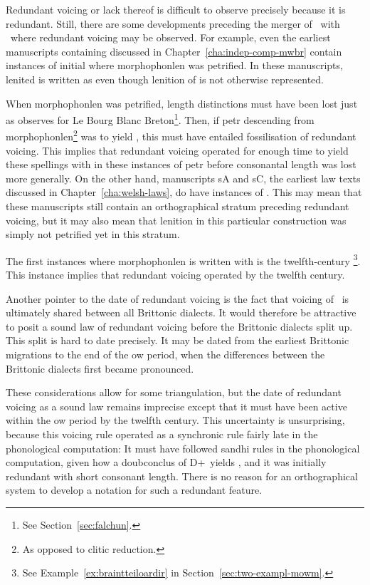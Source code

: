 Redundant voicing or lack thereof is difficult to observe precisely because it is redundant. Still, there are some developments preceding the merger of \lT\ with \xD\ where redundant voicing may be observed. For example, even the earliest manuscripts containing  discussed in Chapter~\ref{cha:indep-comp-mwbr} contain instances of initial  where \gls{morphophonlen} was petrified. In these manuscripts, lenited  is written as  even though lenition of  is not otherwise represented.

When \gls{morphophonlen} was petrified, length distinctions must have been lost just as \textcite{falchun_systeme_1951} observes for Le Bourg Blanc Breton\footnote{See Section~\ref{sec:falchun}.}. Then, if \gls{petr} descending from \gls{morphophonlen}\footnote{As opposed to clitic reduction.} was to yield , this must have entailed fossilisation of redundant voicing. This implies that redundant voicing operated for enough time to yield these spellings with  in these instances of \gls{petr} before consonantal length was lost more generally. On the other hand, manuscripts \gls{sA} and \gls{sC}, the earliest law texts discussed in Chapter~\ref{cha:welsh-laws}, do have instances of . This may mean that these manuscripts still contain an orthographical stratum preceding redundant voicing, but it may also mean that lenition in this particular construction was simply not petrified yet in this stratum.

The first instances where \gls{morphophonlen} is written with  is the twelfth-century \footnote{See Example~\ref{ex:braintteiloardir} in Section~\ref{sec:two-exampl-mowm}.}. This instance implies that redundant voicing operated by the twelfth century.

Another pointer to the date of redundant voicing is the fact that voicing of \lT\ is ultimately shared between all Brittonic dialects. It would therefore be attractive to posit a sound law of redundant voicing before the Brittonic dialects split up. This split is hard to date precisely. It may be dated from the earliest Brittonic migrations to the end of the \gls{ow} period, when the differences between the Brittonic dialects first became pronounced.

These considerations allow for some triangulation, but the date of redundant voicing as a sound law remains imprecise except that it must have been active within the \gls{ow} period  by the twelfth century. This uncertainty is  unsurprising, because this voicing rule operated as a synchronic rule fairly late in the phonological computation: It must have followed sandhi rules in the phonological computation, given how a \gls{doubconclus} of \gls{D}+\lT\ yields \xT, and it was initially redundant with short consonant length. There is no reason for an orthographical system to develop a notation for such a redundant feature.

